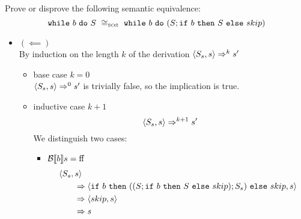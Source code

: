 \begin{exercise}{
    Prove or disprove the following semantic equivalence:
    \[ \wwhile{b}{S}\ \cong_{\text{\tiny SOS}}\ \wwhile{b}{(S;\wif{b}{S}{skip})} \]
}
\begin{itemize}
\begin{itemize}
\begin{itemize}
\begin{itemize}
                                    \begin{gather*}
                                        k_3 + k_4 = k_2 - 2 \qquad\qquad\qquad \instr{S}{s''} \Rightarrow^{k_3} s''' \\
                                        \instr{\wwhile{b}{S}}{s'''} \Rightarrow^{k_4} s'
                                    \end{gather*}
                                    Thus by the composition lemma:
                                    \[
                                        \instr{\wif{b}{S}{skip};S_s}{s''}
                                        \Rightarrow \instr{S;S_s}{s''}
                                        \Rightarrow^* \instr{S_s}{s'''}
                                    \]
                                    Since $\instr{\wwhile{b}{S}}{s'''} \Rightarrow^{k_4} s'$ and $k_4 = k - k_1 - k_3 - 3 \leq k$ the inductive hypothesis holds and thus $\instr{S_s}{s'''} \Rightarrow^* s'$
                            \end{itemize}
                    \end{itemize}
            \end{itemize}
        \item $(\impliedby)$ \\
            By induction on the length $k$ of the derivation $\left<S_s, s\right> \Rightarrow^k s'$
            \begin{itemize}
                \item base case $k=0$ \\
                    $\left<S_s, s\right> \Rightarrow^0 s'$ is trivially false, so the implication is true.
                \item inductive case $k+1$
                    \[ \left<S_s, s\right> \Rightarrow^{k+1} s' \]
                    We distinguish two cases:
                    \begin{itemize}
                        \item $\mathcal{B} \llbracket b \rrbracket s = \text{ff}$
                            \begin{align*}
                                &\instr{S_s}{s}
                                \\&\qquad\Rightarrow \instr{\wif{b}{((S;\wif{b}{S}{skip});S_s)}{skip}}{s}
                                \\&\qquad\Rightarrow \instr{skip}{s}
                                \\&\qquad\Rightarrow s
                                \\

\end{align*}
\end{itemize}
\end{itemize}
\end{itemize}
\end{exercise}
